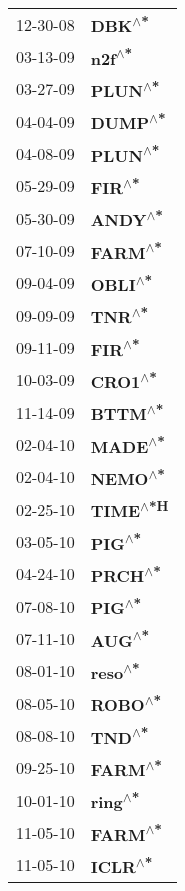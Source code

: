 \begin{supertabular}{p{0.08\textwidth}p{0.2\textwidth}}
 12-30-08 &    \textbf{DBK\textsuperscript{$\wedge$*}} \\
 03-13-09 &    \textbf{n2f\textsuperscript{$\wedge$*}} \\
 03-27-09 &   \textbf{PLUN\textsuperscript{$\wedge$*}} \\
 04-04-09 &   \textbf{DUMP\textsuperscript{$\wedge$*}} \\
 04-08-09 &   \textbf{PLUN\textsuperscript{$\wedge$*}} \\
 05-29-09 &    \textbf{FIR\textsuperscript{$\wedge$*}} \\
 05-30-09 &   \textbf{ANDY\textsuperscript{$\wedge$*}} \\
 07-10-09 &   \textbf{FARM\textsuperscript{$\wedge$*}} \\
 09-04-09 &   \textbf{OBLI\textsuperscript{$\wedge$*}} \\
 09-09-09 &    \textbf{TNR\textsuperscript{$\wedge$*}} \\
 09-11-09 &    \textbf{FIR\textsuperscript{$\wedge$*}} \\
 10-03-09 &   \textbf{CRO1\textsuperscript{$\wedge$*}} \\
 11-14-09 &   \textbf{BTTM\textsuperscript{$\wedge$*}} \\
 02-04-10 &   \textbf{MADE\textsuperscript{$\wedge$*}} \\
 02-04-10 &   \textbf{NEMO\textsuperscript{$\wedge$*}} \\
 02-25-10 &  \textbf{TIME\textsuperscript{$\wedge$*H}} \\
 03-05-10 &    \textbf{PIG\textsuperscript{$\wedge$*}} \\
 04-24-10 &   \textbf{PRCH\textsuperscript{$\wedge$*}} \\
 07-08-10 &    \textbf{PIG\textsuperscript{$\wedge$*}} \\
 07-11-10 &    \textbf{AUG\textsuperscript{$\wedge$*}} \\
 08-01-10 &   \textbf{reso\textsuperscript{$\wedge$*}} \\
 08-05-10 &   \textbf{ROBO\textsuperscript{$\wedge$*}} \\
 08-08-10 &    \textbf{TND\textsuperscript{$\wedge$*}} \\
 09-25-10 &   \textbf{FARM\textsuperscript{$\wedge$*}} \\
 10-01-10 &   \textbf{ring\textsuperscript{$\wedge$*}} \\
 11-05-10 &   \textbf{FARM\textsuperscript{$\wedge$*}} \\
 11-05-10 &   \textbf{ICLR\textsuperscript{$\wedge$*}} \\

\end{supertabular}
